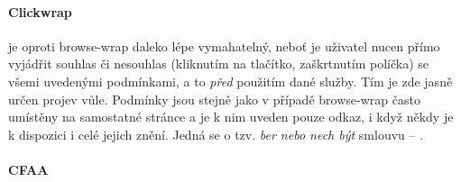 \documentclass[thesis=B,czech]{FITthesis}[2012/06/26]
\begin{document}
\paragraph{Clickwrap}\label{def:clickwrap} je oproti browse-wrap daleko lépe vymahatelný, neboť je uživatel nucen přímo vyjádřit souhlas či nesouhlas (kliknutím na tlačítko, zaškrtnutím políčka) se všemi uvedenými podmínkami, a to \emph{před} použitím dané služby. Tím je zde jasně určen projev vůle. Podmínky jsou stejně jako v případě browse-wrap často umístěny na samostatné stránce a je k nim uveden pouze odkaz, i když někdy je k dispozici i celé jejich znění. Jedná se o tzv. \emph{ber nebo nech být} smlouvu -- \cite{take_it_or_leave_it}.\cite{click_wrap}

\paragraph{CFAA}
\end{document}

